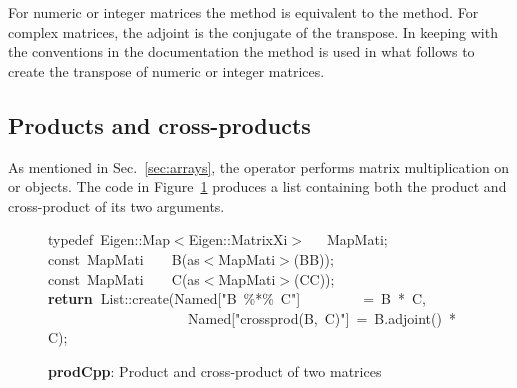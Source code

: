 \documentclass[shortnames,article]{jss}
\newcommand{\hlstd}[1]{\textcolor[rgb]{0,0,0}{#1}}
\newcommand{\hlopt}[1]{\textcolor[rgb]{0,0,0}{#1}}
\newcommand{\hlstr}[1]{\textcolor[rgb]{0.90,0.15,0.15}{#1}}
\newcommand{\hlkwa}[1]{\textcolor[rgb]{0.61,0.13,0.93}{\bf{#1}}}
\newcommand{\hlkwb}[1]{\textcolor[rgb]{0.13,0.54,0.13}{#1}}
\newcommand{\hlkwc}[1]{\textcolor[rgb]{0,0,1}{#1}}
\newcommand{\hlkwd}[1]{\textcolor[rgb]{0,0,0}{#1}}
\begin{document}
For numeric or integer matrices the  method is
equivalent to the  method.  For complex matrices,
the adjoint is the conjugate of the transpose.  In keeping with the
conventions in the  documentation the 
method is used in what follows to create the transpose of numeric or
integer matrices.


\subsection{Products and cross-products}
\label{sec:products}

As mentioned in Sec.~\ref{sec:arrays}, the  operator
performs matrix multiplication on  or
 objects. The  code in
Figure~\ref{prod} produces a list containing both the product and
cross-product of its two arguments.

\begin{figure}[htb]
  \noindent
  \ttfamily
  \hlstd{}\hlkwc{typedef\ }\hlstd{Eigen}\hlopt{::}\hlstd{Map}\hlopt{$<$}\hlstd{Eigen}\hlopt{::}\hlstd{MatrixXi}\hlopt{$>$}\hlstd{\ \ \ }\hlopt{}\hlstd{MapMati}\hlopt{;}\hspace*{\fill}\\
  \hlstd{}\hlkwb{const\ }\hlstd{MapMati}\hlstd{\ \ \ \ }\hlstd{}\hlkwd{B}\hlstd{}\hlopt{(}\hlstd{as}\hlopt{$<$}\hlstd{MapMati}\hlopt{$>$(}\hlstd{BB}\hlopt{));}\hspace*{\fill}\\
  \hlstd{}\hlkwb{const\ }\hlstd{MapMati}\hlstd{\ \ \ \ }\hlstd{}\hlkwd{C}\hlstd{}\hlopt{(}\hlstd{as}\hlopt{$<$}\hlstd{MapMati}\hlopt{$>$(}\hlstd{CC}\hlopt{));}\hspace*{\fill}\\
  \hlstd{}\hlkwa{return\ }\hlstd{List}\hlopt{::}\hlstd{}\hlkwd{create}\hlstd{}\hlopt{(}\hlstd{Named}\hlopt{{[}}\hlstd{}\hlstr{"B\ \%{*}\%\ C"}\hlstd{}\hlopt{{]}}\hlstd{\ \ \ \ \ \ \ \ \ }\hlopt{=\ }\hlstd{B\ }\hlopt{{*}\ }\hlstd{C}\hlopt{,}\hspace*{\fill}\\
  \hlstd{}\hlstd{\ \ \ \ \ \ \ \ \ \ \ \ \ \ \ \ \ \ \ \ }\hlstd{Named}\hlopt{{[}}\hlstd{}\hlstr{"crossprod(B,\ C)"}\hlstd{}\hlopt{{]}\ =\ }\hlstd{B}\hlopt{.}\hlstd{}\hlkwd{adjoint}\hlstd{}\hlopt{()\ {*}\ }\hlstd{C}\hlopt{);}\hlstd{}\hspace*{\fill}\\
  \mbox{}
  \normalfont
  \normalsize
  \caption{\textbf{prodCpp}: Product and cross-product of two matrices}
  \label{prod}
\end{figure}
\end{document}
